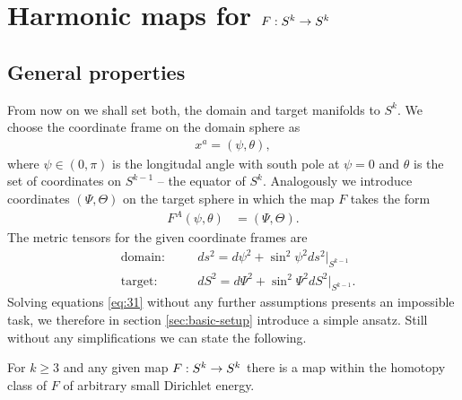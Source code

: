 \section{Harmonic maps for $F:S^k\rightarrow S^k$}
\label{sec:harmonic-maps-skra}

\subsection{General properties}
\label{sec:general-properties}

From now on we shall set both, the domain and target manifolds to
$S^k$. We choose the coordinate frame on the domain sphere as
\begin{align}
  \label{eq:46}
  x^a=(\psi,\theta),
\end{align}
where $\psi\in(0,\pi)$ is the longitudal angle with
south pole at $\psi=0$ and $\theta$ is the set of coordinates on
$S^{k-1}$ -- the equator of $S^k$. Analogously we introduce
coordinates $(\Psi,\Theta)$ on the target sphere in which the map $F$
takes the form
\begin{align}
  \label{eq:47}
  F^A(\psi,\theta)&=(\Psi,\Theta).
\end{align}
The metric tensors for the given coordinate frames are
\begin{align}
  \label{eq:23}
  &\text{domain:}&\quad &ds^2=d\psi^2+\sin^2\psi^2ds^2\big|_{S^{k-1}}\\
  &\text{target:}&\quad &dS^2=d\Psi^2+\sin^2\Psi^2dS^2\big|_{S^{k-1}}.
\end{align}
Solving equations \eqref{eq:31} without any further assumptions
presents an impossible task, we therefore in section
\ref{sec:basic-setup} introduce a simple ansatz. Still without any
simplifications we can state the following.

\begin{theorem}\label{thm:skk-energy-bound}
  For $k\ge3$ and any given map $F:S^k\rightarrow S^k$ there is a map within
  the homotopy class of $F$ of arbitrary small Dirichlet energy.
\end{theorem}


